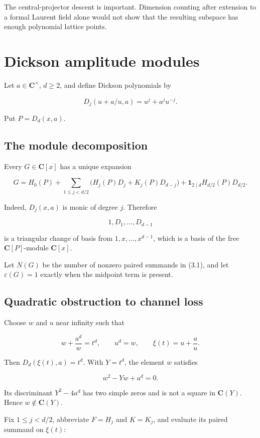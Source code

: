 \documentclass[
  11pt,
  a4paper,
]{amsart}
\begin{document}
The central-projector descent is important. Dimension counting after
extension to a formal Laurent field alone would not show that the
resulting subspace has enough polynomial lattice points.

\section{Dickson amplitude modules}

Let \(a\in\mathbf C^\times\), \(d\ge2\), and define Dickson polynomials
by

\[
D_j(u+a/u,a)=u^j+a^ju^{-j}.
\]

Put \(P=D_d(x,a)\).

\subsection{The module decomposition}

Every \(G\in\mathbf C[x]\) has a unique expansion

\[
G=H_0(P)+
\sum_{1\le j<d/2}
\bigl(H_j(P)D_j+K_j(P)D_{d-j}\bigr)
+\mathbf1_{2\mid d}H_{d/2}(P)D_{d/2}.                 \tag{3.1}
\]

Indeed, \(D_j(x,a)\) is monic of degree \(j\). Therefore

\[
1,D_1,\ldots,D_{d-1}
\]

is a triangular change of basis from \(1,x,\ldots,x^{d-1}\), which is a
basis of the free \(\mathbf C[P]\)-module \(\mathbf C[x]\).

Let \(N(G)\) be the number of nonzero paired summands in (3.1), and let
\(\varepsilon(G)=1\) exactly when the midpoint term is present.

\subsection{Quadratic obstruction to channel loss}

Choose \(w\) and \(u\) near infinity such that

\[
w+\frac{a^d}{w}=t^d,\qquad u^d=w,\qquad
\xi(t)=u+\frac au.
\]

Then \(D_d(\xi(t),a)=t^d\). With \(Y=t^d\), the element \(w\) satisfies

\[
w^2-Yw+a^d=0.                                           \tag{3.2}
\]

Its discriminant \(Y^2-4a^d\) has two simple zeros and is not a square
in \(\mathbf C(Y)\). Hence \(w\notin\mathbf C(Y)\).

Fix \(1\le j<d/2\), abbreviate \(F=H_j\) and \(K=K_j\), and evaluate its
paired summand on \(\xi(t)\):
\end{document}
